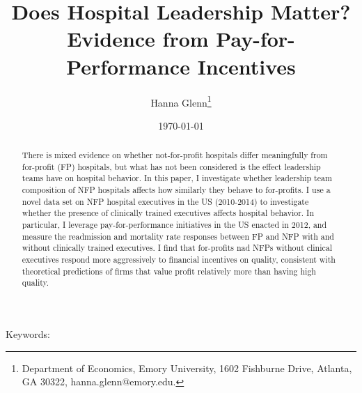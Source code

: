 \documentclass[12pt]{article}
\begin{document}
	
	
	
	
	\linespread{1.2}\title{\vspace{-0.5in} Does Hospital Leadership Matter?\\ \large Evidence from Pay-for-Performance Incentives} 
	
	\date{\today}
	
	\author{\vspace{10mm}Hanna Glenn\footnote{Department of Economics, Emory University, 1602 Fishburne Drive, Atlanta, GA 30322, hanna.glenn@emory.edu.} }
	
	\maketitle
	
	\vspace{-0.2in}
	
	\singlespacing\maketitle


 \vspace{3mm}
	
    \begin{abstract}
		{\small
        There is mixed evidence on whether not-for-profit hospitals differ meaningfully from for-profit (FP) hospitals, but what has not been considered is the effect leadership teams have on hospital behavior. In this paper, I investigate whether leadership team composition of NFP hospitals affects how similarly they behave to for-profits. I use a novel data set on NFP hospital executives in the US (2010-2014) to investigate whether the presence of clinically trained executives affects hospital behavior. In particular, I leverage pay-for-performance initiatives in the US enacted in 2012, and measure the  readmission and mortality rate responses between FP and NFP with and without clinically trained executives. I find that for-profits nad NFPs without clinical executives respond more aggressively to financial incentives on quality, consistent with theoretical predictions of firms that value profit relatively more than having high quality. 
		} 
	\end{abstract}
	
	
	
	
	\vspace{0.8in}
	
	\noindent Keywords: 
	
\end{document}
